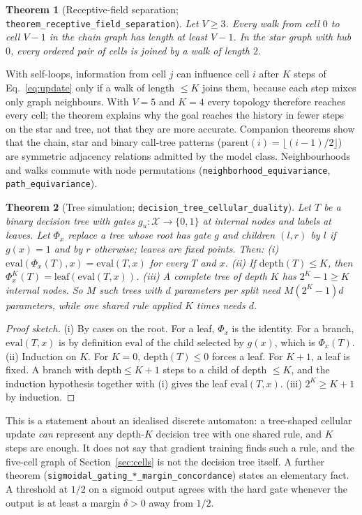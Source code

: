 \documentclass[10pt,twocolumn,letterpaper]{article}
\newtheorem{theorem}{Theorem}
\begin{document}
\begin{theorem}[Receptive-field separation; \texttt{theorem\_\allowbreak{}receptive\_\allowbreak{}field\_\allowbreak{}separation}]\label{thm:diameter}
Let $V\ge3$. Every walk from cell $0$ to cell $V{-}1$ in the chain graph has length at least $V{-}1$. In the star graph with hub $0$, every ordered pair of cells is joined by a walk of length $2$.
\end{theorem}
With self-loops, information from cell $j$ can influence cell $i$ after $K$ steps of Eq.~\eqref{eq:update} only if a walk of length $\le K$ joins them, because each step mixes only graph neighbours. With $V{=}5$ and $K{=}4$ every topology therefore reaches every cell; the theorem explains why the goal reaches the history in fewer steps on the star and tree, not that they are more accurate. Companion theorems show that the chain, star and binary call-tree patterns ($\mathrm{parent}(i) = \lfloor (i-1)/2\rfloor$) are symmetric adjacency relations admitted by the model class. Neighbourhoods and walks commute with node permutations (\texttt{neighborhood\_\allowbreak{}equivariance}, \texttt{path\_\allowbreak{}equivariance}).

\begin{theorem}[Tree simulation; \texttt{decision\_\allowbreak{}tree\_\allowbreak{}cellular\_\allowbreak{}duality}]\label{thm:tree-nca-duality}
Let $T$ be a binary decision tree with gates $g_u:\mathcal{X}\to\{0,1\}$ at internal nodes and labels at leaves. Let $\Phi_x$ replace a tree whose root has gate $g$ and children $(l,r)$ by $l$ if $g(x)=1$ and by $r$ otherwise; leaves are fixed points. Then:
(i) $\mathrm{eval}(\Phi_x(T),x) = \mathrm{eval}(T,x)$ for every $T$ and $x$.
(ii) If $\mathrm{depth}(T)\le K$, then $\Phi_x^{K}(T) = \mathrm{leaf}(\mathrm{eval}(T,x))$.
(iii) A complete tree of depth $K$ has $2^K-1\ge K$ internal nodes. So $M$ such trees with $d$ parameters per split need $M(2^K-1)d$ parameters, while one shared rule applied $K$ times needs $d$.
\end{theorem}
\begin{proof}[Proof sketch]
(i) By cases on the root. For a leaf, $\Phi_x$ is the identity. For a branch, $\mathrm{eval}(T,x)$ is by definition $\mathrm{eval}$ of the child selected by $g(x)$, which is $\Phi_x(T)$. (ii) Induction on $K$. For $K{=}0$, $\mathrm{depth}(T)\le0$ forces a leaf. For $K{+}1$, a leaf is fixed. A branch with $\mathrm{depth}\le K{+}1$ steps to a child of depth $\le K$, and the induction hypothesis together with (i) gives the leaf $\mathrm{eval}(T,x)$. (iii) $2^K \ge K+1$ by induction.
\end{proof}
This is a statement about an idealised discrete automaton: a tree-shaped cellular update \emph{can} represent any depth-$K$ decision tree with one shared rule, and $K$ steps are enough. It does not say that gradient training finds such a rule, and the five-cell graph of Section~\ref{sec:cells} is not the decision tree itself. A further theorem (\texttt{sigmoidal\_\allowbreak{}gating\_\allowbreak{}*\_\allowbreak{}margin\_\allowbreak{}concordance}) states an elementary fact. A threshold at $1/2$ on a sigmoid output agrees with the hard gate whenever the output is at least a margin $\delta>0$ away from $1/2$.
\end{document}

